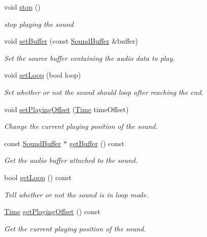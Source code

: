 \begin{DoxyCompactItemize}
void \hyperlink{classsf_1_1Sound_aa9c91c34f7c6d344d5ee9b997511f754}{stop} ()
\begin{DoxyCompactList}\small\item\em stop playing the sound \end{DoxyCompactList}\item 
void \hyperlink{classsf_1_1Sound_a8b395e9713d0efa48a18628c8ec1972e}{set\+Buffer} (const \hyperlink{classsf_1_1SoundBuffer}{Sound\+Buffer} \&buffer)
\begin{DoxyCompactList}\small\item\em Set the source buffer containing the audio data to play. \end{DoxyCompactList}\item 
void \hyperlink{classsf_1_1Sound_af23ab4f78f975bbabac031102321612b}{set\+Loop} (bool loop)
\begin{DoxyCompactList}\small\item\em Set whether or not the sound should loop after reaching the end. \end{DoxyCompactList}\item 
void \hyperlink{classsf_1_1Sound_ab905677846558042022dd6ab15cddff0}{set\+Playing\+Offset} (\hyperlink{classsf_1_1Time}{Time} time\+Offset)
\begin{DoxyCompactList}\small\item\em Change the current playing position of the sound. \end{DoxyCompactList}\item 
const \hyperlink{classsf_1_1SoundBuffer}{Sound\+Buffer} $\ast$ \hyperlink{classsf_1_1Sound_ab873727ae652c96b5a9437d7f8d8a44d}{get\+Buffer} () const
\begin{DoxyCompactList}\small\item\em Get the audio buffer attached to the sound. \end{DoxyCompactList}\item 
bool \hyperlink{classsf_1_1Sound_a054da07266ce8f39229495146e3041eb}{get\+Loop} () const
\begin{DoxyCompactList}\small\item\em Tell whether or not the sound is in loop mode. \end{DoxyCompactList}\item 
\hyperlink{classsf_1_1Time}{Time} \hyperlink{classsf_1_1Sound_a559bc3aea581107bcb380fdbe523aa08}{get\+Playing\+Offset} () const
\begin{DoxyCompactList}\small\item\em Get the current playing position of the sound. \end{DoxyCompactList}\item 

\end{DoxyCompactItemize}
